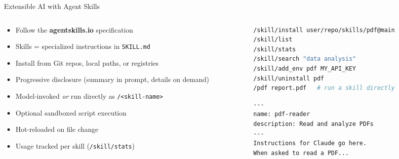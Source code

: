 \documentclass[aspectratio=169,10pt]{beamer}
\begin{document}
\begin{frame}[fragile]{Extensible AI with Agent Skills}
\begin{columns}[T]
\begin{column}{0.48\textwidth}
\begin{itemize}
  \item Follow the \textbf{agentskills.io} specification
  \item Skills = specialized instructions in \texttt{SKILL.md}
  \item Install from Git repos, local paths, or registries
  \item Progressive disclosure (summary in prompt, details on demand)
  \item Model-invoked \emph{or} run directly as \texttt{/<skill-name>}
  \item Optional sandboxed script execution
  \item Hot-reloaded on file change
  \item Usage tracked per skill (\texttt{/skill/stats})
\end{itemize}
\end{column}
\begin{column}{0.48\textwidth}
\begin{lstlisting}[style=code,language=bash,basicstyle=\ttfamily\tiny,title={\scriptsize Skill Management}]
/skill/install user/repo/skills/pdf@main
/skill/list
/skill/stats
/skill/search "data analysis"
/skill/add_env pdf MY_API_KEY
/skill/uninstall pdf
/pdf report.pdf   # run a skill directly
\end{lstlisting}

\smallskip
\begin{lstlisting}[style=code,basicstyle=\ttfamily\tiny,title={\scriptsize SKILL.md structure}]
---
name: pdf-reader
description: Read and analyze PDFs
---
Instructions for Claude go here.
When asked to read a PDF...
\end{lstlisting}
\end{column}
\end{columns}
\end{frame}
\end{document}
